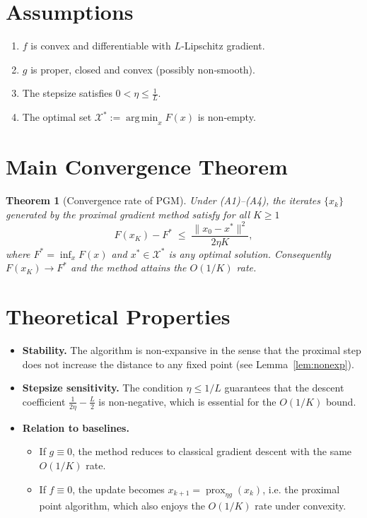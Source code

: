 \documentclass[11pt]{article}
\newtheorem{theorem}{Theorem}
\newcommand{\prox}{\operatorname{prox}}
\newcommand{\argmin}{\operatorname*{arg\,min}}
\begin{document}
\newpage
\section*{Assumptions}
\begin{enumerate}
\item[(A1)] $f$ is convex and differentiable with $L$‑Lipschitz gradient.
\item[(A2)] $g$ is proper, closed and convex (possibly non‑smooth).
\item[(A3)] The stepsize satisfies $0<\eta\le\frac{1}{L}$.
\item[(A4)] The optimal set $\mathcal{X}^{*}:=\argmin_{x}F(x)$ is non‑empty.
\end{enumerate}

\section*{Main Convergence Theorem}
\begin{theorem}[Convergence rate of PGM]\label{thm:rate}
Under (A1)–(A4), the iterates $\{x_{k}\}$ generated by the proximal gradient method satisfy for all $K\ge1$
\[
F(x_{K})-F^{*}\;\le\;\frac{\|x_{0}-x^{*}\|^{2}}{2\eta K},
\]
where $F^{*}= \inf_{x}F(x)$ and $x^{*}\in\mathcal{X}^{*}$ is any optimal solution.
Consequently $F(x_{K})\to F^{*}$ and the method attains the $O(1/K)$ rate.
\end{theorem}

\section*{Theoretical Properties}
\begin{itemize}
\item \textbf{Stability.} The algorithm is non‑expansive in the sense that the proximal step does not increase the distance to any fixed point (see Lemma~\ref{lem:nonexp}).
\item \textbf{Stepsize sensitivity.} The condition $\eta\le 1/L$ guarantees that the descent coefficient $\frac{1}{2\eta}-\frac{L}{2}$ is non‑negative, which is essential for the $O(1/K)$ bound.
\item \textbf{Relation to baselines.}
    \begin{itemize}
        \item If $g\equiv0$, the method reduces to classical gradient descent with the same $O(1/K)$ rate.
        \item If $f\equiv0$, the update becomes $x_{k+1}=\prox_{\eta g}(x_{k})$, i.e. the proximal point algorithm, which also enjoys the $O(1/K)$ rate under convexity.
    \end{itemize}
\end{itemize}
\end{document}
